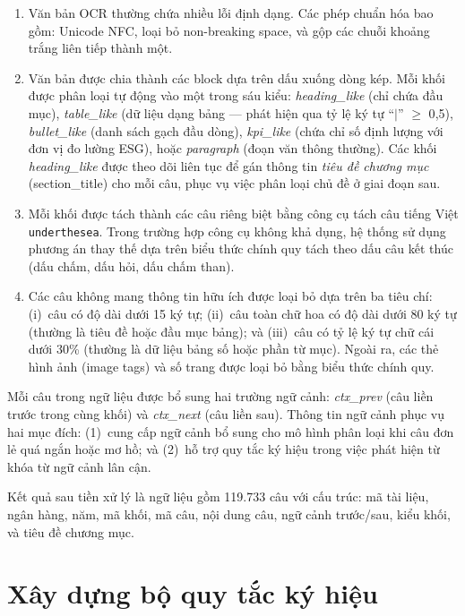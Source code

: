 \begin{enumerate}
    \item Văn bản OCR thường chứa nhiều lỗi định dạng. Các phép chuẩn hóa bao gồm: Unicode NFC, loại bỏ non-breaking space, và gộp các chuỗi khoảng trắng liên tiếp thành một.

    \item Văn bản được chia thành các block dựa trên dấu xuống dòng kép. Mỗi khối được phân loại tự động vào một trong sáu kiểu: \textit{heading\_like} (chỉ chứa đầu mục), \textit{table\_like} (dữ liệu dạng bảng --- phát hiện qua tỷ lệ ký tự ``$|$'' $\geq$ 0{,}5), \textit{bullet\_like} (danh sách gạch đầu dòng), \textit{kpi\_like} (chứa chỉ số định lượng với đơn vị đo lường ESG), hoặc \textit{paragraph} (đoạn văn thông thường). Các khối \textit{heading\_like} được theo dõi liên tục để gán thông tin \textit{tiêu đề chương mục} (section\_title) cho mỗi câu, phục vụ việc phân loại chủ đề ở giai đoạn sau.

    \item Mỗi khối được tách thành các câu riêng biệt bằng công cụ tách câu tiếng Việt \texttt{underthesea}. Trong trường hợp công cụ không khả dụng, hệ thống sử dụng phương án thay thế dựa trên biểu thức chính quy tách theo dấu câu kết thúc (dấu chấm, dấu hỏi, dấu chấm than).

    \item Các câu không mang thông tin hữu ích được loại bỏ dựa trên ba tiêu chí: (i)~câu có độ dài dưới 15 ký tự; (ii)~câu toàn chữ hoa có độ dài dưới 80 ký tự (thường là tiêu đề hoặc đầu mục bảng); và (iii)~câu có tỷ lệ ký tự chữ cái dưới 30\% (thường là dữ liệu bảng số hoặc phần từ mục). Ngoài ra, các thẻ hình ảnh (image tags) và số trang được loại bỏ bằng biểu thức chính quy.
\end{enumerate}

Mỗi câu trong ngữ liệu được bổ sung hai trường ngữ cảnh: \textit{ctx\_prev} (câu liền trước trong cùng khối) và \textit{ctx\_next} (câu liền sau). Thông tin ngữ cảnh phục vụ hai mục đích: (1)~cung cấp ngữ cảnh bổ sung cho mô hình phân loại khi câu đơn lẻ quá ngắn hoặc mơ hồ; và (2)~hỗ trợ quy tắc ký hiệu trong việc phát hiện từ khóa từ ngữ cảnh lân cận.

Kết quả sau tiền xử lý là ngữ liệu gồm 119.733 câu với cấu trúc: mã tài liệu, ngân hàng, năm, mã khối, mã câu, nội dung câu, ngữ cảnh trước/sau, kiểu khối, và tiêu đề chương mục.

\section{Xây dựng bộ quy tắc ký hiệu}
\label{sec:symbolic_rules}
\label{sec:grounded_rules}

